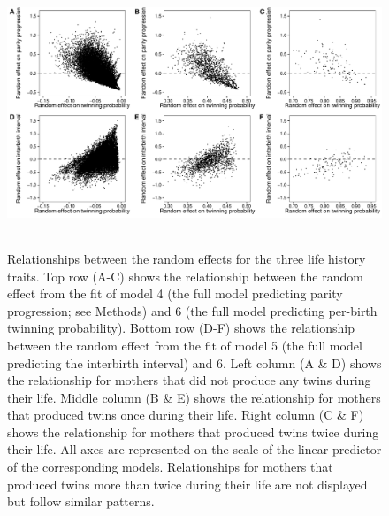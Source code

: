 \documentclass[a4paper]{article}\usepackage[]{graphicx}\usepackage[]{color}
\begin{document}
\begin{figure}[H]
\begin{center}
\includegraphics[height = 8cm]{../figures/figS2.pdf}
\end{center}
\caption{Relationships between the random effects for the three life history traits.
Top row (A-C) shows the relationship between the random effect from the fit of model 4 (the full model predicting parity progression; see Methods) and 6 (the full model predicting per-birth twinning probability). Bottom row (D-F) shows the relationship between the random effect from the fit of model 5 (the full model predicting the interbirth interval) and 6. Left column (A \& D) shows the relationship for mothers that did not produce any twins during their life. Middle column (B \& E) shows the relationship for mothers that produced twins once during their life. Right column (C \& F) shows the relationship for mothers that produced twins twice during their life. All axes are represented on the scale of the linear predictor of the corresponding models. Relationships for mothers that produced twins more than twice during their life are not displayed but follow similar patterns.}
\end{figure}
\end{document}
